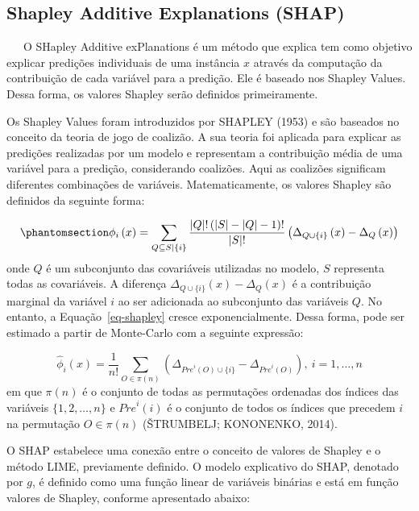 \documentclass[
  12pt,
  a4paper,
]{scrreprt}
\begin{document}
\subsection{Shapley Additive Explanations
(SHAP)}\label{shapley-additive-explanations-shap}

~~~O SHapley Additive exPlanations é um método que explica tem como
objetivo explicar predições individuais de uma instância \(x\) através
da computação da contribuição de cada variável para a predição. Ele é
baseado nos Shapley Values. Dessa forma, os valores Shapley serão
definidos primeiramente.

\vspace{12pt}

Os Shapley Values foram introduzidos por SHAPLEY (1953) e são baseados
no conceito da teoria de jogo de coalizão. A sua teoria foi aplicada
para explicar as predições realizadas por um modelo e representam a
contribuição média de uma variável para a predição, considerando
coalizões. Aqui as coalizões significam diferentes combinações de
variáveis. Matematicamente, os valores Shapley são definidos da seguinte
forma:

\begin{equation}\phantomsection\label{eq-shapley}{
\phi_i\left(x\right) = \sum_{Q \subseteq S | \{i\}} \frac{|Q|!\left(|S| - |Q| - 1\right)!}{|S|!} \left(\Delta_{Q\cup \{i\}}\left(x\right) - \Delta_{Q}\left(x\right)\right)
}\end{equation} onde \(Q\) é um subconjunto das covariáveis utilizadas
no modelo, \(S\) representa todas as covariáveis. A diferença
\(\Delta_{Q \cup \{i\}}\left(x\right) - \Delta_{Q}\left(x\right)\) é a
contribuição marginal da variável \(i\) ao ser adicionada ao subconjunto
das variáveis \(Q\). No entanto, a Equação~\ref{eq-shapley} cresce
exponencialmente. Dessa forma, pode ser estimado a partir de Monte-Carlo
com a seguinte expressão:

\[
\hat{\phi}_{i}\left(x\right) = \frac{1}{n!} \sum_{O \in \pi \left(n \right)} \left( \Delta_{{Pre}^{i} \left(O\right) \cup \{i\}} - \Delta_{{Pre}^{i} \left(O\right)} \right), \ i = 1, \dots, n
\] em que \(\pi\left(n\right)\) é o conjunto de todas as permutações
ordenadas dos índices das variáveis \(\{1, 2, \dots, n\}\) e
\({Pre}^{i}\left(i\right)\) é o conjunto de todos os índices que
precedem \(i\) na permutação \(O \in \pi \left(n\right)\) (ŠTRUMBELJ;
KONONENKO, 2014).

\vspace{12pt}

O SHAP estabelece uma conexão entre o conceito de valores de Shapley e o
método LIME, previamente definido. O modelo explicativo do SHAP,
denotado por \(g\), é definido como uma função linear de variáveis
binárias e está em função valores de Shapley, conforme apresentado
abaixo:
\end{document}
